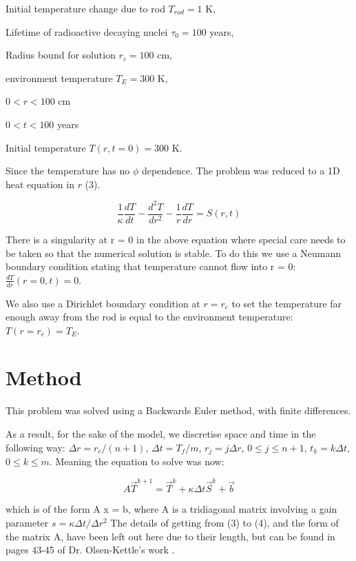 \documentclass{article}
\begin{document}
Initial temperature change due to rod $T_{rod} = 1$ K,

Lifetime of radioactive decaying nuclei $\tau_0 = 100$ years, 
  
Radius bound for solution $r_c = 100$ cm, 

environment temperature $T_E = 300$ K, 

$0 < r < 100$ cm 

$0 < t < 100$ years

Initial temperature $T(r, t = 0) = 300$ K.

\vspace{5mm}

Since the temperature has no $\phi$ dependence. The problem was reduced to a 1D heat equation in $r$ (3). 

\begin{equation}
\frac{1}{\kappa} \frac{dT}{dt} - \frac{d^2T}{dr^2} - \frac{1}{r} \frac{dT}{dr} = S(r,t)
\end{equation}

There is a singularity at r = 0 in the above equation where special care needs to be taken so that the numerical solution is stable. To do this we  use a Neumann boundary condition stating that temperature cannot flow into r = 0: $\frac{dT}{dr}(r = 0, t) = 0$.

We also use a Dirichlet boundary condition at $r = r_c$ to set the temperature far enough away from the rod is equal to the environment temperature: $T(r=r_c) = T_E$.







\section{Method}

This problem was solved using a Backwards Euler method\cite{BEuler}, with finite differences\cite{FiniteDifference}. 

As a result, for the sake of the model, we discretise space and time in the following way: $\Delta r=r_c/(n+1)$, $\Delta t = T_f /m$, $r_j = j\Delta r$, $0 \leq j \leq n + 1$, $t_k = k\Delta t$, $0 \leq k \leq m$. Meaning the equation to solve was now:

\begin{equation}
A\vec{T}^{k+1} = \vec{T}^k + \kappa \Delta t \vec{S}^k + \vec{b} 
\end{equation}

which is of the form A x = b, where A is a tridiagonal matrix involving a gain parameter $s = \kappa \Delta t / \Delta r^2$ The details of getting from (3) to (4), and the form of the matrix A, have been left out here due to their length, but can be found in pages 43-45 of Dr. Olsen-Kettle's work \cite{Olsen-Kettle}.
\end{document}
